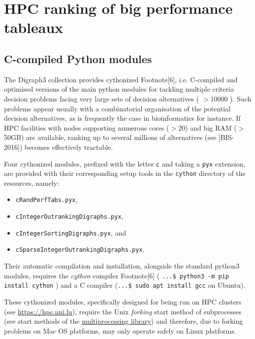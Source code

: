 \chapter{HPC ranking of big performance tableaux}
\label{sec:11}



\section{C-compiled Python modules}
\label{sec:11.1}

The Digraph3 collection provides cythonized Footnote[6], i.e. C-compiled and optimised versions of the main python modules for tackling multiple criteria decision problems facing very large sets of decision alternatives ( $> 10000$ ). Such problems appear usually with a combinatorial organisation of the potential decision alternatives, as is frequently the case in bioinformatics for instance. If HPC facilities with nodes supporting numerous cores ($> 20$) and big RAM ($>$ 50GB) are available, ranking up to several millions of alternatives (see [BIS-2016]) becomes effectively tractable.

Four cythonized \Digraph modules, prefixed with the letter \texttt{c} and taking a \texttt{pyx} extension, are provided with their corresponding setup tools in the \texttt{cython} directory of the \Digraph resources, namely:
\begin{itemize}
\item[] \texttt{cRandPerfTabs.pyx},
\item[] \texttt{cIntegerOutrankingDigraphs.pyx},
\item[] \texttt{cIntegerSortingDigraphs.pyx}, and
\item[] \texttt{cSparseIntegerOutrankingDigraphs.pyx}.
\end{itemize}

Their automatic compilation and installation, alongside the standard \Digraph python3 modules, requires the \emph{cython} compiler Footnote[6] ( \texttt{...\$ python3 -m pip install cython} ) and a C compiler (\texttt{...\$ sudo apt install gcc} on Ubuntu).

\begin{svgraybox}These cythonized modules, specifically designed for being run on HPC clusters (see \href{https://hpc.uni.lu}{https://hpc.uni.lu}), require the Unix \emph{forking} start method of subprocesses (see start methods of the \href{https://docs.python.org/3/library/multiprocessing.html#contexts-and-start-methods}{multiprocessing library})  and therefore, due to forking problems on Mac OS platforms, may only operate safely on Linux platforms.
\end{svgraybox}

